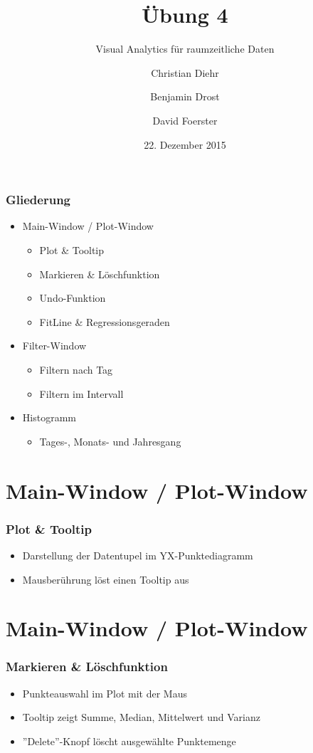 \documentclass{beamer}
\title{Übung 4}
\subtitle{Visual Analytics für raumzeitliche Daten}
\author{Christian Diehr \and Benjamin Drost \and David Foerster}
\institute{Institut für Informatik\\Humboldt-Universität zu Berlin}
\date{22. Dezember 2015}
\begin{document}
    \begin{frame}
        \titlepage
    \end{frame}
    \logo %
    
    \section{}
    \begin{frame}
	    \frametitle{Gliederung}
			\begin{itemize}
			\item Main-Window / Plot-Window
				\begin{itemize}
				\item Plot \& Tooltip
				\item Markieren \& Löschfunktion
				\item Undo-Funktion
				\item FitLine \& Regressionsgeraden
				\end{itemize}
			\item Filter-Window
				\begin{itemize}
				\item Filtern nach Tag
				\item Filtern im Intervall
				\end{itemize}
			\item Histogramm
				\begin{itemize}
				\item Tages-, Monats- und Jahresgang
				\end{itemize}
			\end{itemize}
    \end{frame}

    \section{Main-Window / Plot-Window}
    \begin{frame}
	    \frametitle{Plot \& Tooltip}
			\begin{itemize}
			\setlength\itemsep{1em}
			\item Darstellung der Datentupel im YX-Punktediagramm
			\item Mausberührung löst einen Tooltip aus
			\end{itemize}
    \end{frame}

    \section{Main-Window / Plot-Window}
    \begin{frame}
			\frametitle{Markieren \& Löschfunktion}
			\begin{itemize}
				\setlength\itemsep{1em}
				\item Punkteauswahl im Plot mit der Maus
				\item Tooltip zeigt Summe, Median, Mittelwert und Varianz
				\item ''Delete''-Knopf löscht ausgewählte Punktemenge
			\end{itemize}
    \end{frame}
    
\end{document}
